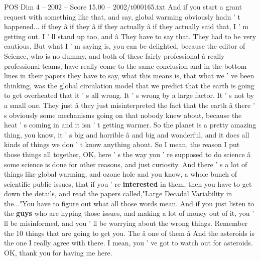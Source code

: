 \begin{textsample}{POS Dim 4 – 2002 – Score 15.00 – 2002/t000165.txt}
And if you start a grant request with something like that, and say, global warming obviously hadn ' t happened... if they â if they â if they actually â if they actually said that, I ' m getting out.
I ' ll stand up too, and â They have to say that.
They had to be very cautious.
But what I ' m saying is, you can be delighted, because the editor of Science, who is no dummy, and both of these fairly professional â really professional teams, have really come to the same conclusion and in the bottom lines in their papers they have to say, what this means is, that what we ' ve been thinking, was the global circulation model that we predict that the earth is going to get overheated that it ' s all wrong.
It ' s wrong by a large factor.
It ' s not by a small one.
They just â they just misinterpreted the fact that the earth â there ' s obviously some mechanisms going on that nobody knew about, because the heat ' s coming in and it isn ' t getting warmer.
So the planet is a pretty amazing thing, you know, it ' s big and horrible â and big and wonderful, and it does all kinds of things we don ' t know anything about.
So I mean, the reason I put those things all together, OK, here ' s the way you ' re supposed to do science â some science is done for other reasons, and just curiosity.
And there ' s a lot of things like global warming, and ozone hole and you know, a whole bunch of scientific public issues, that if you ' re \textbf{interested} in them, then you have to get down the details, and read the papers called,"Large Decadal Variability in the..."You have to figure out what all those words mean.
And if you just listen to the \textbf{guys} who are hyping those issues, and making a lot of money out of it, you ' ll be misinformed, and you ' ll be worrying about the wrong things.
Remember the 10 things that are going to get you.
The â one of them â And the asteroids is the one I really agree with there.
I mean, you ' ve got to watch out for asteroids.
OK, thank you for having me here.

\end{textsample}
